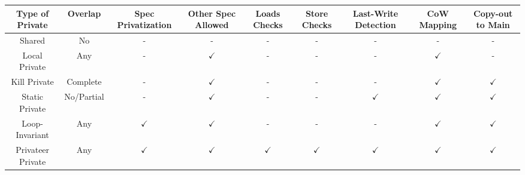 \centering
\tiny
\begin{tabular}{|c|c|c|c|c|c|c|c|c|}
  \hline
  Type of Private &
  Overlap         &
  Spec Privatization &
  Other Spec Allowed    &
  Loads Checks  &
  Store Checks    &
  Last-Write Detection &
  CoW Mapping &
  Copy-out to Main \\

 \hline
 Shared & No & - & - & - & - & - & - & - \\
 \hline
 Local Private & Any & - & $\checkmark$ & - & - & - & $\checkmark$ & - \\
 \hline
 Kill Private & Complete & - & $\checkmark$ & - & - & - & $\checkmark$ &
$\checkmark$ \\
 \hline
 Static Private & No/Partial & - & $\checkmark$ & - & - &
 $\checkmark$ & $\checkmark$ & $\checkmark$ \\
 \hline
 Loop-Invariant & Any & $\checkmark$ & $\checkmark$ & - & - & - & $\checkmark$ &
$\checkmark$ \\
 \hline
 Privateer Private & Any & $\checkmark$ & $\checkmark$ & $\checkmark$ & $\checkmark$ &
 $\checkmark$ & $\checkmark$ & $\checkmark$ \\
 \hline
\end{tabular}

